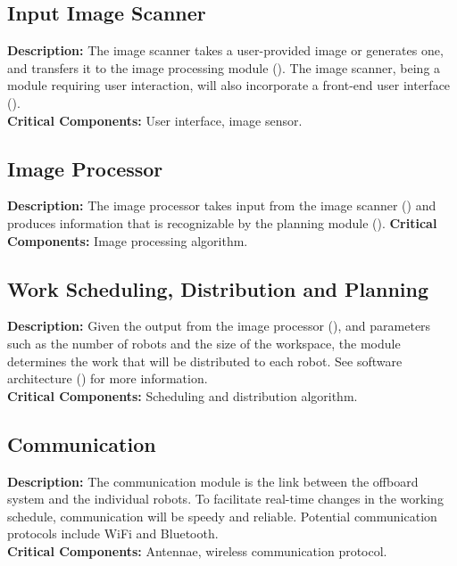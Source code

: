 \subsection{Input Image Scanner}
\label{sec:subsystem_input_scanner}
\textbf{Description:} The image scanner takes a user-provided image or generates one, and transfers it to the image processing module (). The image scanner, being a module requiring user interaction, will also incorporate a front-end user interface ().\\
\textbf{Critical Components:} User interface, image sensor.\\

\subsection{Image Processor}
\label{sec:subsystem_image_processor}
\textbf{Description:} The image processor takes input from the image scanner () and produces information that is recognizable by the planning module (). 
\textbf{Critical Components:} Image processing algorithm.

\subsection{Work Scheduling, Distribution and Planning}
\label{sec:subsystem_planner}
\textbf{Description:} Given the output from the image processor (), and parameters such as the number of robots and the size of the workspace, the module determines the work that will be distributed to each robot. See software architecture () for more information.\\
\textbf{Critical Components:} Scheduling and distribution algorithm.\\

\subsection{Communication}
\label{sec:subsystem_communication}
\textbf{Description:} The communication module is the link between the offboard system and the individual robots. To facilitate real-time changes in the working schedule, communication will be speedy and reliable. Potential communication protocols include WiFi and Bluetooth.\\
\textbf{Critical Components:} Antennae, wireless communication protocol.\\

